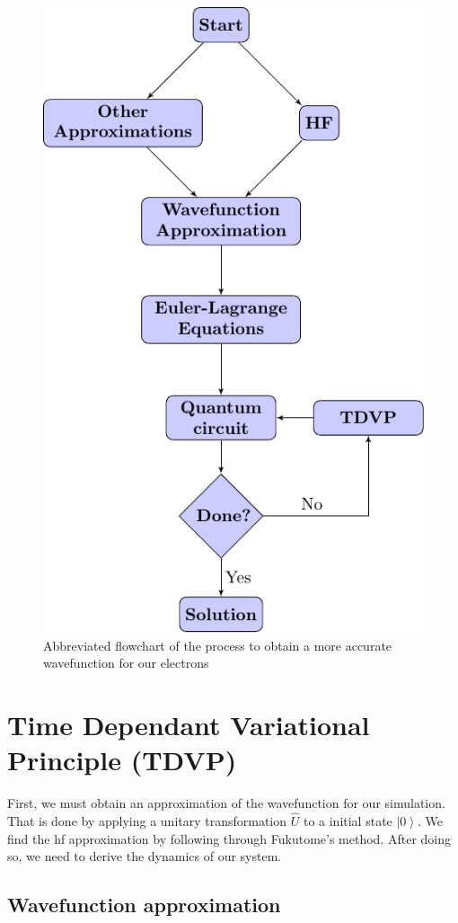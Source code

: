 \documentclass{aux/ttuthes2007}
\newcommand{\ket}[1]{\ensuremath{\left|#1\right\rangle}}
\begin{document}
\begin{figure}[hb!]
	\centering
  \includegraphics[width=.7\linewidth]{flowcharts/flowchart1.pdf}
  \caption{Abbreviated flowchart of the process to obtain a more accurate wavefunction for our electrons}
  \label{fig:flowchart1}
\end{figure}

\section{\textbf{Time Dependant Variational Principle (TDVP)}}\label{sec:tdvp}
First, we must obtain an approximation of the wavefunction for our simulation. That is done by applying a unitary transformation $\hat U$ to a initial state $\ket 0$.
We find the \gls {hf} approximation by following through Fukutome's method\cite{fukutome}. After doing so, we need to derive the dynamics of our system.

\subsection{\textbf{Wavefunction approximation}}
\end{document}

